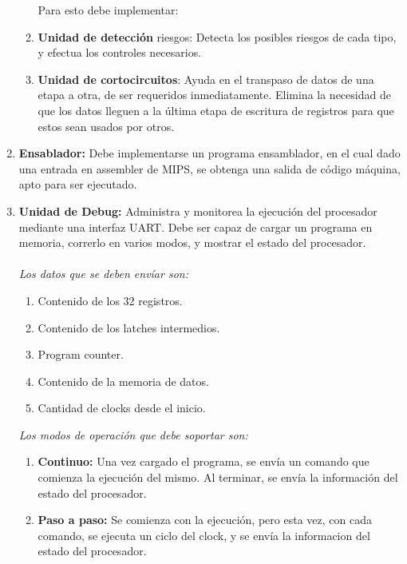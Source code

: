 \documentclass[12pt]{article}
\begin{document}
\begin{enumerate}
\begin{enumerate}
    Para esto debe implementar:
    \item \textbf{Unidad de detección} riesgos: Detecta los posibles riesgos de cada tipo, y efectua los controles necesarios.
    \item \textbf{Unidad de cortocircuitos}: Ayuda en el transpaso de datos de una etapa a otra, de ser requeridos inmediatamente. Elimina la necesidad de que los datos lleguen a la última etapa de escritura de registros para que estos sean usados por otros. 
  \end{enumerate}
      \item \textbf{Ensablador:} Debe implementarse un programa ensamblador, en el cual dado una entrada en assembler de MIPS, se obtenga una salida de código máquina, apto para ser ejecutado.
      \item \textbf{Unidad de Debug:} Administra y monitorea la ejecución del procesador mediante una interfaz UART. Debe ser capaz de cargar un programa en memoria, correrlo en varios modos, y mostrar el estado del procesador. \\ \\
      \textit{Los datos que se deben envíar son:} \\
      \begin{enumerate}
        \item Contenido de los 32 registros.
        \item Contenido de los latches intermedios.
        \item Program counter.
        \item Contenido de la memoria de datos.
        \item Cantidad de clocks desde el inicio. \\
      \end{enumerate}
      \textit{Los modos de operación que debe soportar son:} \\

      \begin{enumerate}
        \item \textbf{Continuo:} Una vez cargado el programa, se envía un comando que comienza la ejecución del mismo. Al terminar, se envía la información del estado del procesador.
        \item \textbf{Paso a paso:} Se comienza con la ejecución, pero esta vez, con cada comando, se ejecuta un ciclo del clock, y se envía la informacion del estado del procesador. \\
      \end{enumerate}


\end{enumerate}
\end{document}
